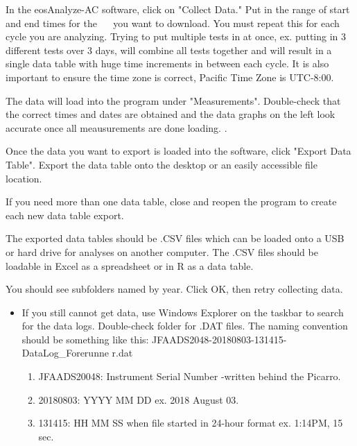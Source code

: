 \documentclass[12pt]{../SOP3}\usepackage[]{graphicx}\usepackage[]{color}
\begin{document}
\NP In the eosAnalyze-AC software, click on "Collect Data." Put in the range of start and end times for the ~~ you want to download. You must repeat this for each cycle you are analyzing. Trying to put multiple tests in at once, ex. putting in 3 different tests over 3 days, will combine all tests together and will result in a single data table with huge time increments in between each cycle. It is also important to ensure the time zone is correct, Pacific Time Zone is UTC-8:00.

\NP The data will load into the program under "Measurements". Double-check that the correct times and dates are obtained and the data graphs on the left look accurate once all meausurements are done loading. .

\NP Once the data you want to export is loaded into the software, click "Export Data Table". Export the data table onto the desktop or an easily accessible file location. 

\NP If you need more than one data table, close and reopen the program to create each new data table export. 

\NP The exported data tables should be .CSV files which can be loaded onto a USB or hard drive for analyses on another computer. The .CSV files should be loadable in Excel as a spreadsheet or in R as a data table. 



You should see subfolders named by year. Click OK, then retry collecting data. 
\begin{itemize}
      \item If you still cannot get data, use Windows Explorer on the taskbar to search for the data logs. Double-check %
     folder for .DAT files. The naming convention should be something like this: JFAADS2048-20180803-131415-DataLog\_Forerunne       r.dat
      \begin{enumerate}
      \item JFAADS20048: Instrument Serial Number -written behind the Picarro.
      \item 20180803: YYYY MM DD ex. 2018 August 03. 
      \item 131415: HH MM SS when file started in 24-hour format ex. 1:14PM, 15 sec.
      \end{enumerate}
\end{itemize}
\end{document}
